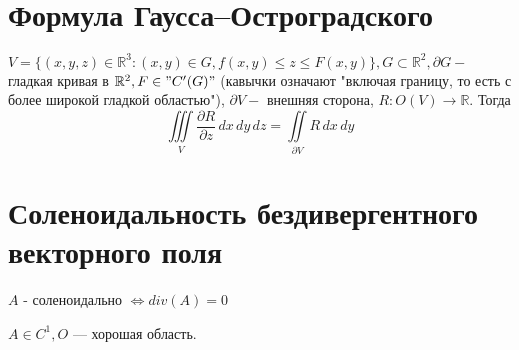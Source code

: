 \documentclass[paper=a4, fontsize=14pt]{report}
\begin{document}
    \section{Формула Гаусса--Остроградского}
    $V = \{(x,y,z)\in \mathbb{R}^3: (x,y) \in G, f(x, y) \leq z \leq F(x,y)\}, G \subset \mathbb{R}^2, \partial G -$ гладкая кривая в $\mathbb{R}^2, F \in "C'(G)"$ (кавычки означают "включая границу, то есть с более широкой гладкой областью"), $\partial V - $ внешняя сторона, $R: O(V) \rightarrow \mathbb{R}$. Тогда
    $$\iiint\limits_{V}{\frac {\partial R}{\partial z} \,dx\,dy\,dz = \iint\limits_{\partial V}{R\,dx\,dy}}$$

    \section{Соленоидальность бездивергентного векторного поля}

    $A$ - соленоидально $ \Leftrightarrow div(A) = 0 $

    $A \in C^1, O $ --- хорошая область.
\end{document}
